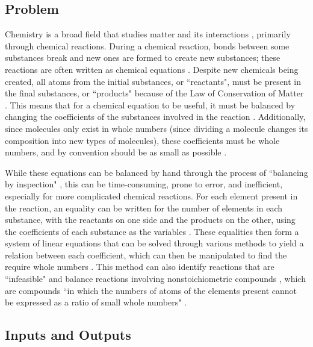 \documentclass{article}
\begin{document}
\subsection{Problem} \label{prob}

Chemistry is a broad field that studies matter and its interactions
\cite{gordon_chm101_2023}, primarily through chemical reactions.
During a chemical reaction, bonds between some substances break and new ones are
formed to create new substances; these reactions are often written as chemical
equations \cite{lund_introduction_2023}. Despite new chemicals being created,
all atoms from the initial substances, or ``reactants", must be present in the
final substances, or ``products" because of the Law of Conservation of Matter
\cite{lund_introduction_2023}. This means that for a chemical equation to be
useful, it must be balanced by changing the coefficients of the substances
involved in the reaction \cite{lund_introduction_2023}. Additionally, since
molecules only exist in whole numbers (since dividing a molecule changes its
composition into new types of molecules), these coefficients must be whole
numbers, and by convention should be as small as possible
\cite{lund_introduction_2023}.

While these equations can be balanced by hand through the process of
``balancing by inspection" \cite{lund_introduction_2023}, this can be
time-consuming, prone
to error, and inefficient, especially for more complicated chemical reactions.
For each element present in the reaction, an equality can be written for the
number of elements in each substance, with the reactants on one side and the
products on the other, using the coefficients of each substance as the
variables \cite{hamid_balancing_2019}. These equalities then form a system of
linear
equations that can be solved through various methods to yield a relation
between each coefficient, which can then be manipulated to find the require
whole
numbers \cite{lund_introduction_2023, hamid_balancing_2019}. This method can
also identify reactions that are ``infeasible" and balance reactions involving
nonstoichiometric compounds \cite{hamid_balancing_2019}, which are compounds
``in which the numbers of atoms of the elements present cannot be expressed as
a ratio of small whole numbers"
\cite{the_editors_of_encyclopaedia_britannica_nonstoichiometric_2010}.

\subsection{Inputs and Outputs} \label{io}
\end{document}
